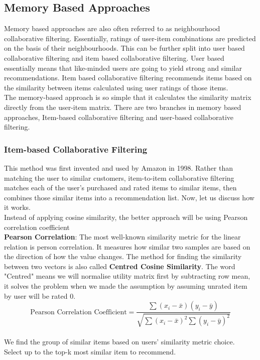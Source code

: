\subsection{Memory Based Approaches}
Memory based approaches are also often referred to as neighbourhood collaborative filtering. Essentially, ratings of user-item combinations are predicted on the basis of their neighbourhoods. 
This can be further split into user based collaborative filtering and item based collaborative filtering. 
User based essentially means that like-minded users are going to yield strong and similar recommendations. Item based collaborative filtering recommends items based on the similarity between items calculated using user ratings of those items.
\\The memory-based approach is so simple that it calculates the similarity matrix directly from the user-item matrix. There are two branches in memory based approaches, Item-based collaborative filtering and user-based collaborative filtering.

\subsubsection{Item-based Collaborative Filtering}
This method was first invented and used by Amazon in 1998. 
Rather than matching the user to similar customers, item-to-item collaborative filtering matches each of the user’s purchased and rated items to similar items, then combines those similar items into a recommendation list. Now, let us discuss how it works.
\\Instead of applying cosine similarity, the better approach will be using Pearson correlation coefficient
\\\textbf{Pearson Correlation}: The most well-known similarity metric for the linear relation is person correlation. It measures how similar two samples are based on the direction of how the value changes. 
The method for finding the similarity between two vectors is also called \textbf{Centred Cosine Similarity}. The word "Centred" means we will normalise utility matrix first by subtracting row mean, it solves the problem when we made the assumption by assuming unrated item by user will be rated 0. 
\begin{equation*}
\text{Pearson Correlation Coefficient} = \frac{\sum(x_{i} - \bar{x})(y_{i} - \bar{y})} {\sqrt{\sum(x_{i} - \bar{x})^{2} \sum{(y_{i} - \bar{y})^{2} }}}
\end{equation*}
\\We find the group of similar items based on users' similarity metric choice.
\\Select up to the top-k most similar item to recommend.



